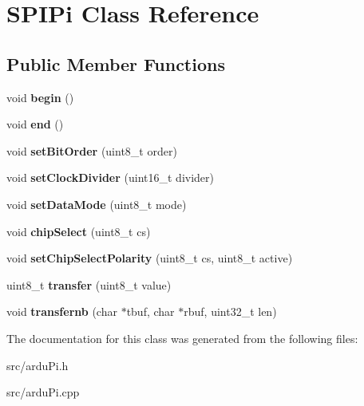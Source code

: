 \hypertarget{class_s_p_i_pi}{}\section{S\+P\+I\+Pi Class Reference}
\label{class_s_p_i_pi}
\subsection*{Public Member Functions}
\begin{DoxyCompactItemize}
\item 
\hypertarget{class_s_p_i_pi_a6274df6d961da1e9d1433fa74c1d18e7}{}void {\bfseries begin} ()\label{class_s_p_i_pi_a6274df6d961da1e9d1433fa74c1d18e7}

\item 
\hypertarget{class_s_p_i_pi_a574b24be86536b0baf439fc0ef81eb90}{}void {\bfseries end} ()\label{class_s_p_i_pi_a574b24be86536b0baf439fc0ef81eb90}

\item 
\hypertarget{class_s_p_i_pi_ad1d918e5206aabf6682fbd17800347d1}{}void {\bfseries set\+Bit\+Order} (uint8\+\_\+t order)\label{class_s_p_i_pi_ad1d918e5206aabf6682fbd17800347d1}

\item 
\hypertarget{class_s_p_i_pi_a9a82e13fc6a4b0965b79476dc593cc8d}{}void {\bfseries set\+Clock\+Divider} (uint16\+\_\+t divider)\label{class_s_p_i_pi_a9a82e13fc6a4b0965b79476dc593cc8d}

\item 
\hypertarget{class_s_p_i_pi_a5b8f65d9fbf0655a6880caa116b22d6d}{}void {\bfseries set\+Data\+Mode} (uint8\+\_\+t mode)\label{class_s_p_i_pi_a5b8f65d9fbf0655a6880caa116b22d6d}

\item 
\hypertarget{class_s_p_i_pi_a4495da2c13b687ce3ccfeff517801649}{}void {\bfseries chip\+Select} (uint8\+\_\+t cs)\label{class_s_p_i_pi_a4495da2c13b687ce3ccfeff517801649}

\item 
\hypertarget{class_s_p_i_pi_a49852821239783aad30b20a59afc4309}{}void {\bfseries set\+Chip\+Select\+Polarity} (uint8\+\_\+t cs, uint8\+\_\+t active)\label{class_s_p_i_pi_a49852821239783aad30b20a59afc4309}

\item 
\hypertarget{class_s_p_i_pi_aee0e105e2bf4a7da232715eb9fa9515a}{}uint8\+\_\+t {\bfseries transfer} (uint8\+\_\+t value)\label{class_s_p_i_pi_aee0e105e2bf4a7da232715eb9fa9515a}

\item 
\hypertarget{class_s_p_i_pi_a344b536545e24ac029e5bf347e2b8d2c}{}void {\bfseries transfernb} (char $\ast$tbuf, char $\ast$rbuf, uint32\+\_\+t len)\label{class_s_p_i_pi_a344b536545e24ac029e5bf347e2b8d2c}

\end{DoxyCompactItemize}


The documentation for this class was generated from the following files\+:\begin{DoxyCompactItemize}
\item 
src/ardu\+Pi.\+h\item 
src/ardu\+Pi.\+cpp\end{DoxyCompactItemize}
